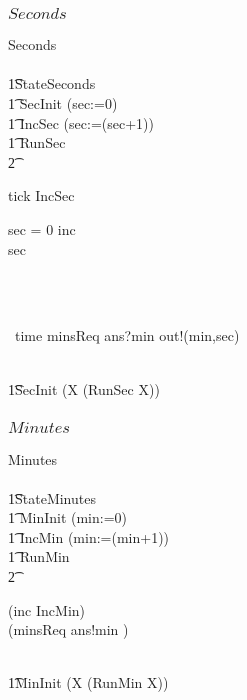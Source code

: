 \subsubsection{$Seconds$}
\begin{circus}
\circprocess Seconds \circdef\ \\
\circbegin\\
\t1\circstate StateSeconds \\
\t1 SecInit \circdef (sec:=0)\\
\t1 IncSec \circdef (sec:=(sec+1))\\
\t1 RunSec \circdef
\\\t2
\begin{block}
\begin{block}
tick \then IncSec \circseq\\
    \begin{block}
      \circif  sec = 0 \circthen inc \then \Skip\\
      \circelse sec  \circthen \Skip \circfi
    \end{block}\\
    \end{block}\\
  \extchoice~time \then minsReq \then ans?min \then out!(min,sec)
      \then \Skip
\end{block}\\
 \t1\circspot SecInit \circseq (\circmu X \circspot (RunSec \circseq X))\\
\circend
\end{circus}
\subsubsection{$Minutes$}

\begin{circus}
\circprocess Minutes \circdef\\\ \circbegin\\
\t1\circstate StateMinutes \\
\t1 MinInit \circdef (min:=0)\\
\t1 IncMin \circdef (min:=(min+1))\\
\t1 RunMin \circdef\\\t2
\begin{block}
  (inc \then IncMin)\\
  \extchoice (minsReq \then ans!min \then \Skip)\\
\end{block}\\
 \t1\circspot MinInit \circseq (\circmu X \circspot (RunMin \circseq X))\\
\circend
\end{circus}

